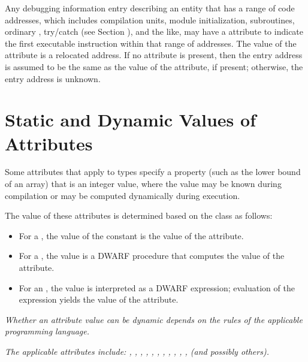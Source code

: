 Any debugging information entry describing an entity that has
a range of code addresses, which includes compilation units,
module initialization, subroutines, 
ordinary , 
try/catch  (see Section ),
and the like, 
may have a  attribute to
indicate the first executable instruction within that range
of addresses. The value of the  attribute is a
relocated address. If no  attribute is present,
then the entry address is assumed to be the same as the
value of the  attribute, if present; otherwise,
the entry address is unknown.

\section{Static and Dynamic Values of Attributes}
\label{chap:staticanddynamicvaluesofattributes}

Some attributes that apply to types specify a property (such
as the lower bound of an array) that is an integer value,
where the value may be known during compilation or may be
computed dynamically during execution.

The value of these
attributes is determined based on the class as follows:
\begin{itemize}
\item For a , the value of the constant is the value of
the attribute.

\item For a , the
value is a DWARF procedure that computes the value of the attribute.

\item For an , the value is interpreted as a 
DWARF expression; 
evaluation of the expression yields the value of
the attribute.
\end{itemize}

\textit{%
Whether an attribute value can be dynamic depends on the
rules of the applicable programming language.
}

\textit{The applicable attributes include: 
,
, 
, 
,
, 
, 
,
, 
,
,
,
 (and possibly others).}

